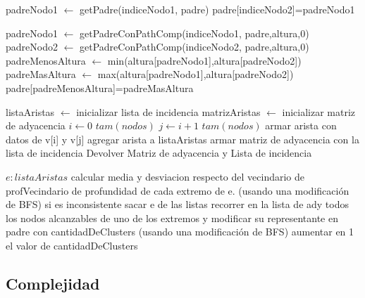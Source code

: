 \documentclass[11pt,a4paper]{article}
\begin{document}
\begin{codebox}
\li padreNodo1 $\gets$ getPadre(indiceNodo1, padre)
\li padre[indiceNodo2]=padreNodo1
\end{codebox}

\begin{codebox}
\li padreNodo1 $\gets$ getPadreConPathComp(indiceNodo1, padre,altura,0)
\li padreNodo2 $\gets$ getPadreConPathComp(indiceNodo2, padre,altura,0)
\li padreMenosAltura $\gets$ min(altura[padreNodo1],altura[padreNodo2])
\li padreMasAltura $\gets$ max(altura[padreNodo1],altura[padreNodo2])
\li padre[padreMenosAltura]=padreMasAltura
\end{codebox}


\begin{codebox}
\li listaAristas $\gets$ inicializar lista de incidencia
\li matrizAristas $\gets$ inicializar matriz de adyacencia
\li \For $i \gets 0$ \To $tam(nodos)$
\li 	\For  $j \gets i+1$ \To $tam(nodos)$
			\li armar arista con datos de v[i] y v[j]
			\li agregar arista a listaAristas
		\End
	\End
\li armar matriz de adyacencia con la lista de incidencia
\li Devolver Matriz de adyacencia y Lista de incidencia
\end{codebox}

\begin{codebox}
\li \For $e:listaAristas$
\li calcular media y desviacion respecto del vecindario de profVecindario de profundidad de cada extremo de e. (usando una modificación de BFS)
\li si es inconsistente
\li sacar e de las listas
\li recorrer en la lista de ady todos los nodos alcanzables de uno de los extremos y modificar su representante en padre con cantidadDeClusters (usando una modificación de BFS)
\li aumentar en 1 el valor de cantidadDeClusters

\li \End
\end{codebox}

\subsection{Complejidad}
\end{document}
